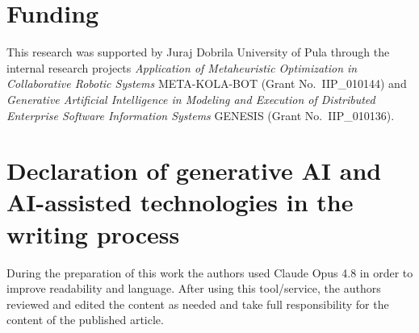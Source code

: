 \documentclass[a4paper]{article}
\begin{document}
\section*{Funding}

This research was supported by Juraj Dobrila University of Pula through the
internal research projects \textit{Application of Metaheuristic Optimization in
Collaborative Robotic Systems} META-KOLA-BOT (Grant No.\ IIP\_010144) and
\textit{Generative Artificial Intelligence in Modeling and Execution of
Distributed Enterprise Software Information Systems} GENESIS (Grant
No.\ IIP\_010136).


\section*{Declaration of generative AI and AI-assisted technologies in the writing process}

%
%
During the preparation of this work the authors used Claude Opus 4.8 in order to improve readability and language. After using this tool/service, the authors reviewed and edited the content as needed and take full responsibility for the content of the published article.
\end{document}
